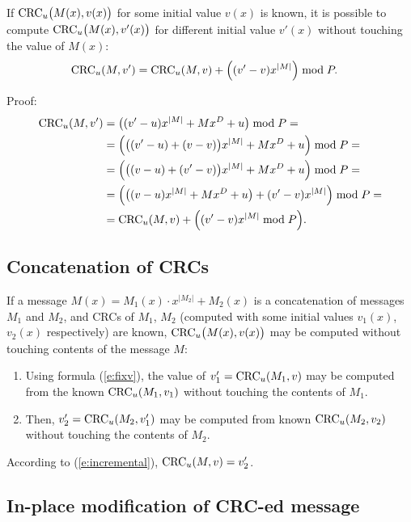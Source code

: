 \documentclass{article}
\begin{document}
If
  ${\rm CRC}_u\bigl(M(x), v(x)\bigr)$
for some initial value $v(x)$ is known, it is possible to compute
  ${\rm CRC}_u\bigl(M(x), v'(x)\bigr)$
for different initial value $v'(x)$ without touching the value of $M(x)$:
  \begin{align}
    {\rm CRC}_u(M, v')
      &= {\rm CRC}_u(M,v) + \Bigl((v'-v) x^{|M|}\Bigr) \bmod P.
  \label{e:fixv}
  \end{align}

Proof:
  \begin{align*}
    {\rm CRC}_u(M, v')
      &= \bigl((v'-u) x^{|M|} + M x^D + u\bigr) \bmod P = \\
      &= \Bigl(\bigl((v'-u)+(v-v)\bigr) x^{|M|} + M x^D + u\Bigr) \bmod P = \\
      &= \Bigl(\bigl((v-u)+(v'-v)\bigr) x^{|M|} + M x^D + u\Bigr) \bmod P = \\
      &= \Bigl(\bigl((v-u) x^{|M|} + M x^D + u\bigr) + (v'-v) x^{|M|}\Bigr) \bmod P = \\
      &= {\rm CRC}_u(M,v) + \Bigl((v'-v) x^{|M|} \bmod P \Bigr).
  \end{align*}


\subsection{Concatenation of CRCs} \label{s:concatenation}

If a message
  $M(x) = M_1(x) \cdot x^{|M_2|} + M_2(x)$
is a concatenation of messages $M_1$ and $M_2$, and CRCs of $M_1$, $M_2$
(computed with some initial values $v_1(x)$, $v_2(x)$ respectively) are
known,
 ${\rm CRC}_u\bigl(M(x),v(x)\bigr)$
may be computed without touching contents of the message $M$:
\begin{enumerate}
\item
  Using formula (\ref{e:fixv}), the value of $v'_1 = {\rm CRC}_u(M_1,v)$ may
  be computed from the known ${\rm CRC}_u(M_1,v_1)$ without touching the contents of $M_1$.
\item
  Then, $v'_2 = {\rm CRC}_u(M_2, v'_1)$ may be computed from known ${\rm CRC}_u(M_2,v_2)$
  without touching the contents of $M_2$.
\end{enumerate}
According to (\ref{e:incremental}), ${\rm CRC}_u(M,v) = v'_2$.



\subsection{In-place modification of CRC-ed message} \label{s:replacement}
\end{document}
